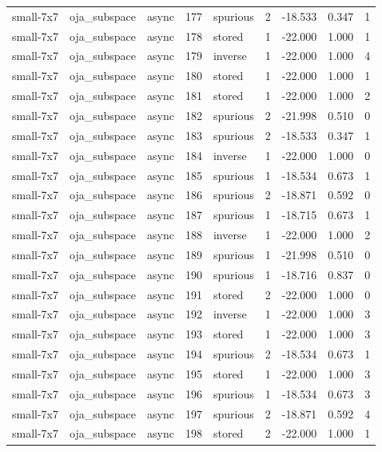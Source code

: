 \begin{tabular}{lllrlrrrr}
small-7x7 & oja\_subspace & async & 177 & spurious & 2 & -18.533 & 0.347 & 1 \\
small-7x7 & oja\_subspace & async & 178 & stored & 1 & -22.000 & 1.000 & 1 \\
small-7x7 & oja\_subspace & async & 179 & inverse & 1 & -22.000 & 1.000 & 4 \\
small-7x7 & oja\_subspace & async & 180 & stored & 1 & -22.000 & 1.000 & 1 \\
small-7x7 & oja\_subspace & async & 181 & stored & 1 & -22.000 & 1.000 & 2 \\
small-7x7 & oja\_subspace & async & 182 & spurious & 2 & -21.998 & 0.510 & 0 \\
small-7x7 & oja\_subspace & async & 183 & spurious & 2 & -18.533 & 0.347 & 1 \\
small-7x7 & oja\_subspace & async & 184 & inverse & 1 & -22.000 & 1.000 & 0 \\
small-7x7 & oja\_subspace & async & 185 & spurious & 1 & -18.534 & 0.673 & 1 \\
small-7x7 & oja\_subspace & async & 186 & spurious & 2 & -18.871 & 0.592 & 0 \\
small-7x7 & oja\_subspace & async & 187 & spurious & 1 & -18.715 & 0.673 & 1 \\
small-7x7 & oja\_subspace & async & 188 & inverse & 1 & -22.000 & 1.000 & 2 \\
small-7x7 & oja\_subspace & async & 189 & spurious & 1 & -21.998 & 0.510 & 0 \\
small-7x7 & oja\_subspace & async & 190 & spurious & 1 & -18.716 & 0.837 & 0 \\
small-7x7 & oja\_subspace & async & 191 & stored & 2 & -22.000 & 1.000 & 0 \\
small-7x7 & oja\_subspace & async & 192 & inverse & 1 & -22.000 & 1.000 & 3 \\
small-7x7 & oja\_subspace & async & 193 & stored & 1 & -22.000 & 1.000 & 3 \\
small-7x7 & oja\_subspace & async & 194 & spurious & 2 & -18.534 & 0.673 & 1 \\
small-7x7 & oja\_subspace & async & 195 & stored & 1 & -22.000 & 1.000 & 3 \\
small-7x7 & oja\_subspace & async & 196 & spurious & 1 & -18.534 & 0.673 & 3 \\
small-7x7 & oja\_subspace & async & 197 & spurious & 2 & -18.871 & 0.592 & 4 \\
small-7x7 & oja\_subspace & async & 198 & stored & 2 & -22.000 & 1.000 & 1 \\

\end{tabular}
